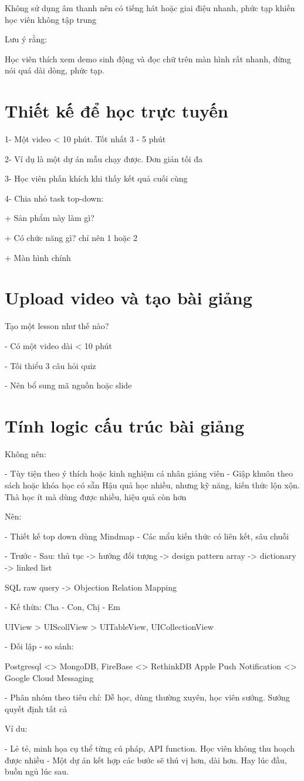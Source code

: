 Không sử dụng âm thanh nên có tiếng hát hoặc giai điệu nhanh, phức tạp khiến học viên không tập trung

Lưu ý rằng:

Học viên thích xem demo sinh động và đọc chữ trên màn hình rất nhanh, đừng nói quá dài dòng, phức tạp.

\section{Thiết kế để học trực tuyến}

1- Một video < 10 phút. Tốt nhất 3 - 5 phút

2- Ví dụ là một dự án mẫu chạy được. Đơn giản tối đa

3- Học viên phấn khích khi thấy kết quả cuối cùng

4- Chia nhỏ task top-down:

+ Sản phẩm này làm gì?

+ Có chức năng gì? chỉ nên 1 hoặc 2

+ Màn hình chính

\section{Upload video và tạo bài giảng}

Tạo một lesson như thế nào?

- Có một video dài < 10 phút

- Tối thiểu 3 câu hỏi quiz

- Nên bổ sung mã nguồn hoặc slide

\section{Tính logic cấu trúc bài giảng}

Không nên:

- Tùy tiện theo ý thích hoặc kinh nghiệm cá nhân giảng viên
- Giập khuôn theo sách hoặc khóa học có sẵn
Hậu quả học nhiều, nhưng kỹ năng, kiến thức lộn xộn. Thà học ít mà dùng được nhiều, hiệu quả còn hơn

Nên:

- Thiết kế top down dùng Mindmap
- Các mẩu kiến thức có liên kết, sâu chuỗi

- Trước - Sau:
 thủ tục -> hướng đối tượng -> design pattern
 array -> dictionary -> linked list

 SQL raw query -> Objection Relation Mapping

- Kế thừa: Cha - Con, Chị - Em

 UIView > UIScollView > UITableView, UICollectionView

- Đối lập - so sánh:

 Postgresql <> MongoDB, FireBase <> RethinkDB
 Apple Push Notification <> Google Cloud Messaging

- Phân nhóm theo tiêu chí: Dễ học, dùng thường xuyên, học viên sướng. Sướng quyết định tất cả

Ví du:

- Lẻ tẻ, minh họa cụ thể từng cú pháp, API function. Học viên không thu hoạch được nhiều
- Một dự án kết hợp các bước sẽ thú vị hơn, dài hơn. Hay lúc đầu, buồn ngủ lúc sau.
